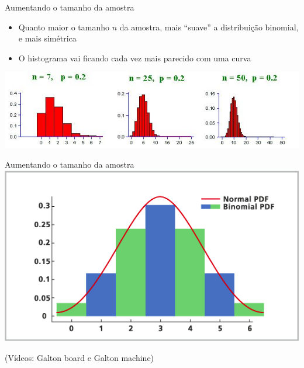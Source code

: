 \documentclass{beamer}
\begin{document}
\begin{frame}{Aumentando o tamanho da amostra}
  \begin{itemize}
  \item Quanto maior o tamanho $n$ da amostra, mais ``suave'' a
    distribuição binomial, e mais simétrica
  \item O histograma vai ficando cada vez mais parecido com uma curva
  \end{itemize}
  \includegraphics[width=\textwidth]{Prob_II/binomial2}

\end{frame}

\begin{frame}{Aumentando o tamanho da amostra}
  \includegraphics[width=\textwidth]{Prob_II/aproximacao}

  (Vídeos: Galton board e Galton machine)
\end{frame}
\end{document}
